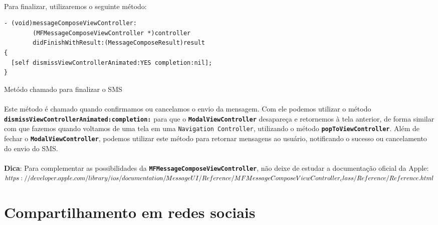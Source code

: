 \documentclass[a4paper,12pt,brazil,doubleside]{book}
\begin{document}
\begin{singlespace}
\paragraph{}Para finalizar, utilizaremos o seguinte método:

\begin{listing}[H]
\begin{verbatim}
- (void)messageComposeViewController:
        (MFMessageComposeViewController *)controller
        didFinishWithResult:(MessageComposeResult)result
{
  [self dismissViewControllerAnimated:YES completion:nil];  
}
\end{verbatim}
\caption{Metódo chamado para finalizar o SMS}
\end{listing}

\paragraph{}Este método é chamado quando confirmamos ou cancelamos o envio da mensagem. Com ele podemos utilizar o método \texttt{\textbf{dismissViewControllerAnimated:completion:}} para que o \texttt{\textbf{ModalViewController}} desapareça e retornemos à tela anterior, de forma similar com que fazemos quando voltamos de uma tela em uma \texttt{Navigation Controller}, utilizando o método \texttt{\textbf{popToViewController}}. Além de fechar o \texttt{\textbf{ModalViewController}}, podemos utilizar este método para retornar mensagens ao usuário, notificando o sucesso ou cancelamento do envio do SMS.

\bigskip

\begin{framed}
\paragraph{}\textbf{Dica}: Para complementar as possibilidades da \texttt{\textbf{MFMessageComposeViewController}}, não deixe de estudar a documentação oficial da Apple:\\
\(https://developer.apple.com/library/ios/documentation/MessageUI/Reference/\\MFMessageComposeViewController_class/Reference/Reference.html\)
\end{framed}


\section{Compartilhamento em redes sociais}


\end{singlespace}
\end{document}
